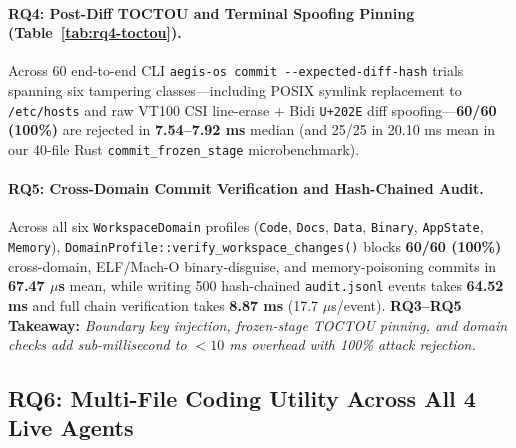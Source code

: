 \documentclass[10pt,twocolumn]{article}
\begin{document}
\paragraph{RQ4: Post-Diff TOCTOU and Terminal Spoofing Pinning (Table~\ref{tab:rq4-toctou}).} Across 60 end-to-end CLI \texttt{aegis-os commit -\/-expected-diff-hash} trials spanning six tampering classes---including POSIX symlink replacement to \texttt{/etc/hosts} and raw VT100 CSI line-erase + Bidi \texttt{U+202E} diff spoofing---\textbf{60/60 (100\%)} are rejected in \textbf{7.54--7.92 ms} median (and 25/25 in 20.10 ms mean in our 40-file Rust \texttt{commit\_frozen\_stage} microbenchmark).

\paragraph{RQ5: Cross-Domain Commit Verification and Hash-Chained Audit.} Across all six \texttt{WorkspaceDomain} profiles (\texttt{Code}, \texttt{Docs}, \texttt{Data}, \texttt{Binary}, \texttt{AppState}, \texttt{Memory}), \texttt{DomainProfile::\allowbreak verify\_\allowbreak workspace\_\allowbreak changes()} blocks \textbf{60/60 (100\%)} cross-domain, ELF/Mach-O binary-disguise, and memory-poisoning commits in \textbf{67.47 $\mu$s} mean, while writing 500 hash-chained \texttt{audit.jsonl} events takes \textbf{64.52 ms} and full chain verification takes \textbf{8.87 ms} (17.7 $\mu$s/event). \textbf{RQ3--RQ5 Takeaway:} \emph{Boundary key injection, frozen-stage TOCTOU pinning, and domain checks add sub-millisecond to $<\!10$ ms overhead with 100\% attack rejection.}

\subsection{RQ6: Multi-File Coding Utility Across All 4 Live Agents}
\end{document}
